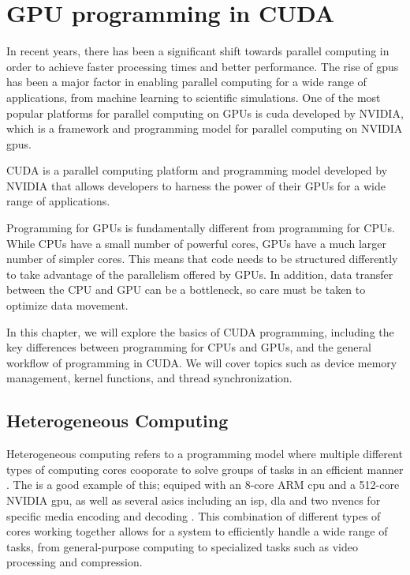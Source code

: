 \section{GPU programming in CUDA}
In recent years, there has been a significant shift towards parallel computing in order to achieve faster processing times and better performance.
The rise of \glspl{gpu} has been a major factor in enabling parallel computing for a wide range of applications, from machine learning to scientific simulations.
One of the most popular platforms for parallel computing on GPUs is \gls{cuda} developed by NVIDIA, which is a framework and programming model for parallel computing on NVIDIA \glspl{gpu}.

CUDA is a parallel computing platform and programming model developed by NVIDIA that allows developers to harness the power of their GPUs for a wide range of applications.

Programming for GPUs is fundamentally different from programming for CPUs.
While CPUs have a small number of powerful cores, GPUs have a much larger number of simpler cores.
This means that code needs to be structured differently to take advantage of the parallelism offered by GPUs.
In addition, data transfer between the CPU and GPU can be a bottleneck, so care must be taken to optimize data movement.

In this chapter, we will explore the basics of CUDA programming, including the key differences between programming for CPUs and GPUs, and the general workflow of programming in CUDA.
We will cover topics such as device memory management, kernel functions, and thread synchronization.


\subsection{Heterogeneous Computing}
Heterogeneous computing refers to a programming model where multiple different types of computing cores cooporate to solve groups of tasks in an efficient manner \cite{armWhatHeterogenousCompute}.
The \jx is a good example of this; equiped with an 8-core ARM \gls{cpu} and a 512-core NVIDIA \gls{gpu}, as well as several \glspl{asic} including an \gls{isp}, \gls{dla} and two \glspl{nvenc} for specific media encoding and decoding \cite[9, 8, 23, 15-22]{nvidiaNVIDIAJetsonAGX2019}.
This combination of different types of cores working together allows for a system to efficiently handle a wide range of tasks, from general-purpose computing to specialized tasks such as video processing and compression.


